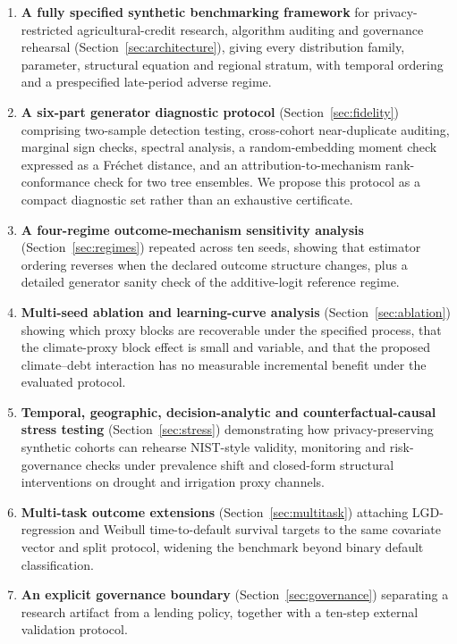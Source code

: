 \documentclass[journal]{IEEEtran}
\begin{document}
\begin{enumerate}
\item \textbf{A fully specified synthetic benchmarking framework} for privacy-restricted agricultural-credit research, algorithm auditing and governance rehearsal (Section~\ref{sec:architecture}), giving every distribution family, parameter, structural equation and regional stratum, with temporal ordering and a prespecified late-period adverse regime.

\item \textbf{A six-part generator diagnostic protocol} (Section~\ref{sec:fidelity}) comprising two-sample detection testing, cross-cohort near-duplicate auditing, marginal sign checks, spectral analysis, a random-embedding moment check expressed as a Fr\'{e}chet distance, and an attribution-to-mechanism rank-conformance check for two tree ensembles. We propose this protocol as a compact diagnostic set rather than an exhaustive certificate.

\item \textbf{A four-regime outcome-mechanism sensitivity analysis} (Section~\ref{sec:regimes}) repeated across ten seeds, showing that estimator ordering reverses when the declared outcome structure changes, plus a detailed generator sanity check of the additive-logit reference regime.

\item \textbf{Multi-seed ablation and learning-curve analysis} (Section~\ref{sec:ablation}) showing which proxy blocks are recoverable under the specified process, that the climate-proxy block effect is small and variable, and that the proposed climate--debt interaction has no measurable incremental benefit under the evaluated protocol.

\item \textbf{Temporal, geographic, decision-analytic and counterfactual-causal stress testing} (Section~\ref{sec:stress}) demonstrating how privacy-preserving synthetic cohorts can rehearse NIST-style validity, monitoring and risk-governance checks under prevalence shift and closed-form structural interventions on drought and irrigation proxy channels.

\item \textbf{Multi-task outcome extensions} (Section~\ref{sec:multitask}) attaching LGD-regression and Weibull time-to-default survival targets to the same covariate vector and split protocol, widening the benchmark beyond binary default classification.

\item \textbf{An explicit governance boundary} (Section~\ref{sec:governance}) separating a research artifact from a lending policy, together with a ten-step external validation protocol.
\end{enumerate}
\end{document}
